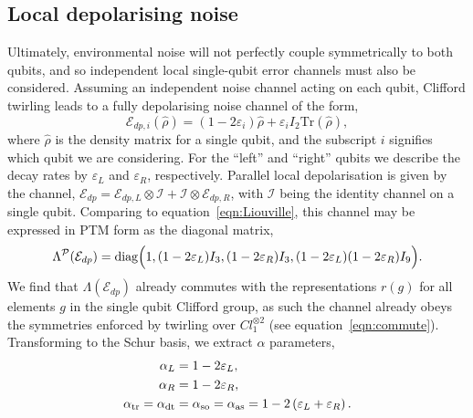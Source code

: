 \subsection{Local depolarising noise}
\label{app:depol_noise}
Ultimately, environmental noise will not perfectly couple symmetrically to both qubits, and so independent local single-qubit error channels must also be considered.
Assuming an independent noise channel acting on each qubit, Clifford twirling leads to a fully depolarising noise channel of the form,
\begin{equation}\label{eqn:1q_depol}
    \mathcal{E}_{dp,i}(\hat\rho)=(1-2\varepsilon_i)\hat\rho+ \varepsilon_iI_2\mathrm{Tr}(\hat\rho),
\end{equation}
where $\hat\rho$ is the density matrix for a single qubit, and the subscript $i$ signifies which qubit we are considering. For the ``left'' and ``right'' qubits we describe the decay rates by $\varepsilon_L$ and $\varepsilon_R$, respectively.
Parallel local depolarisation is given by the channel, $\mathcal{E}_{dp}=\mathcal{E}_{dp,L}\otimes \mathcal{I} + \mathcal{I}\otimes\mathcal{E}_{dp,R}$, with $\mathcal I$ being the identity channel on a single qubit.
Comparing to equation~\ref{eqn:Liouville}, 
this channel may be expressed in PTM form as the diagonal matrix,
\begin{equation}
    \Lambda^\mathcal{P}(\mathcal{E}_{dp}) = \mathrm{diag}\Bigl(1,(1-2\varepsilon_L)I_3,(1-2\varepsilon_R)I_3,(1-2\varepsilon_L)(1-2\varepsilon_R)I_9\Bigr).
\end{equation}
We find that $\Lambda(\mathcal{E}_{dp})$ already commutes with the representations $r(g)$ for all elements $g$ in the single qubit Clifford group, as such the channel already obeys the symmetries enforced by twirling over $Cl_1^{\otimes 2}$ (see equation~\ref{eqn:commute}). Transforming to the Schur basis, we extract $\alpha$ parameters,
\begin{subequations}
\begin{align}
    \alpha_L &= 1-2\varepsilon_L,\\
    \alpha_R &= 1-2\varepsilon_R,\\
    \alpha_{\rm tr} = \alpha_{\rm dt} &=\alpha_{\rm so}=\alpha_{\rm as} = 1 - 2\left(\varepsilon_L+ \varepsilon_R \right).
\end{align}
\end{subequations}

